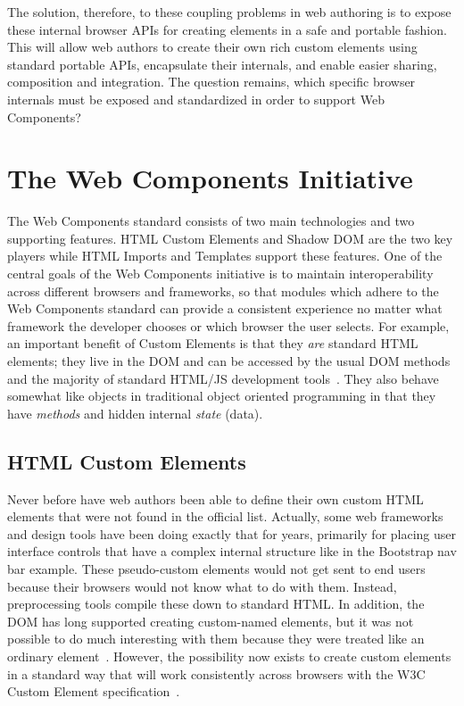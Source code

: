 The solution, therefore, to these coupling problems in web authoring is to expose these internal browser APIs for creating elements in a safe and portable fashion. 
This will allow web authors to create their own rich custom elements using standard portable APIs, encapsulate their internals, and enable easier sharing, composition and integration.
The question remains, which specific browser internals must be exposed and standardized in order to support Web Components?

\section{The Web Components Initiative}

The Web Components standard consists of two main technologies and two supporting features. 
HTML Custom Elements and Shadow DOM are the two key players while HTML Imports and Templates support these features. 
One of the central goals of the Web Components initiative is to maintain interoperability across different browsers and frameworks, 
so that modules which adhere to the Web Components standard can provide a consistent experience no matter what framework the developer chooses or which browser the user selects.
For example, an important benefit of Custom Elements is that they \textit{are} standard HTML elements; they live in the DOM and can be accessed by the usual DOM methods and the majority of standard HTML/JS development tools~\cite{penades2015}.
They also behave somewhat like objects in traditional object oriented programming in that 
they have \textit{methods} and hidden internal \textit{state} (data).

\subsection{HTML Custom Elements}
Never before have web authors been able to define their own custom HTML elements that were not found in the official list.
Actually, some web frameworks and design tools have been doing exactly that for years, primarily for placing user interface controls that have a complex internal structure like in the Bootstrap nav bar example.
These pseudo-custom elements would not get sent to end users because their browsers would not know what to do with them.
Instead, preprocessing tools compile these down to standard HTML.
In addition, the DOM has long supported creating custom-named elements, but it was not possible to do much interesting with them because they were treated like an ordinary 
 element~\cite{w3ccontributors2015-b}.
However, the possibility now exists to create custom elements in a standard way that will work consistently across browsers with the W3C Custom Element
specification~\cite{w3ccontributors2015-b}. 

